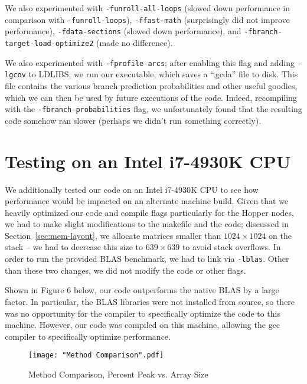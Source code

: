\documentclass{article} %
\begin{document}
We also experimented with \texttt{-funroll-all-loops} (slowed down performance in
comparison with \texttt{-funroll-loops}), \texttt{-ffast-math} (surprisingly
did not improve performance), \texttt{-fdata-sections} (slowed down performance),
and \texttt{-fbranch-target-load-optimize2} (made no difference).

We also experimented with \texttt{-fprofile-arcs}; after enabling this
flag and adding \texttt{-lgcov} to LDLIBS, we run our executable, which saves a
``.gcda'' file to disk. This file contains the various branch prediction
probabilities and other useful goodies, which we can then be used by future
executions of the code. Indeed, recompiling with the
\texttt{-fbranch-probabilities} flag, we unfortunately found that the resulting
code somehow ran slower (perhaps we didn't run something correctly).

\section{Testing on an Intel i7-4930K CPU}
We additionally tested our code on an Intel i7-4930K CPU to see how performance would
be impacted on an alternate machine build. Given that we heavily optimized our code and compile flags particularly
for the Hopper nodes, we had to make slight modifications to the makefile and the code; discussed
in Section~\ref{sec:mem-layout}, we allocate matrices smaller than $1024 \times 1024$
on the stack -- we had to decrease this size to $639\times 639$ to avoid stack overflows.
In order to run the provided BLAS benchmark, we had to link via \texttt{-lblas}. Other
than these two changes, we did not modify the code or other flags.

Shown in Figure 6 below, our code outperforms the native BLAS by a large factor.
In particular, the BLAS libraries were not installed from source, so there was no
opportunity for the compiler to specifically optimize the code to this machine.
However, our code was compiled on this machine, allowing the gcc compiler to specifically
optimize performance.

\clearpage
\begin{figure}  %
 \noindent
 \hspace*{-1.5in}
 \texttt{[image: "Method Comparison".pdf]} %
 \caption{Method Comparison, Percent Peak vs. Array Size}
\end{figure}


\small


\end{document}
